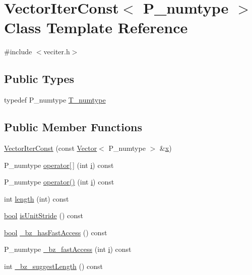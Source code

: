 \hypertarget{classVectorIterConst}{}\section{Vector\+Iter\+Const$<$ P\+\_\+numtype $>$ Class Template Reference}
\label{classVectorIterConst}


{\ttfamily \#include $<$veciter.\+h$>$}

\subsection*{Public Types}
\begin{DoxyCompactItemize}
\item 
typedef P\+\_\+numtype \hyperlink{classVectorIterConst_a9dca841e00192ee5d6277f7443833603}{T\+\_\+numtype}
\end{DoxyCompactItemize}
\subsection*{Public Member Functions}
\begin{DoxyCompactItemize}
\item 
\hyperlink{classVectorIterConst_ac0f827a86530b446ac35169e52f38a2c}{Vector\+Iter\+Const} (const \hyperlink{classVector}{Vector}$<$ P\+\_\+numtype $>$ \&\hyperlink{vecnorm1_8cc_ac73eed9e41ec09d58f112f06c2d6cb63}{x})
\item 
P\+\_\+numtype \hyperlink{classVectorIterConst_a69a9b3393046cd494ec477cc04a4717c}{operator\mbox{[}$\,$\mbox{]}} (int \hyperlink{indexexpr_8h_aabd77643995707c185e95c8cb2782c81}{i}) const 
\item 
P\+\_\+numtype \hyperlink{classVectorIterConst_a59218a68b79658b7926468ddf6b080e2}{operator()} (int \hyperlink{indexexpr_8h_aabd77643995707c185e95c8cb2782c81}{i}) const 
\item 
int \hyperlink{classVectorIterConst_a3670612d84e395194fe3cdc5df2877a8}{length} (int) const 
\item 
\hyperlink{compiler_8h_abb452686968e48b67397da5f97445f5b}{bool} \hyperlink{classVectorIterConst_ae4bf5a07bd6f95b1fb33600fd4c2e1d3}{is\+Unit\+Stride} () const 
\item 
\hyperlink{compiler_8h_abb452686968e48b67397da5f97445f5b}{bool} \hyperlink{classVectorIterConst_a50c98e070fca163f71d2adac2c7d80aa}{\+\_\+bz\+\_\+has\+Fast\+Access} () const 
\item 
P\+\_\+numtype \hyperlink{classVectorIterConst_a51babf4bdbcaf9aa2d00c7c3df8ae79c}{\+\_\+bz\+\_\+fast\+Access} (int \hyperlink{indexexpr_8h_aabd77643995707c185e95c8cb2782c81}{i}) const 
\item 
int \hyperlink{classVectorIterConst_a26a27eef00bf17bebfe53da97f64107a}{\+\_\+bz\+\_\+suggest\+Length} () const 
\end{DoxyCompactItemize}
